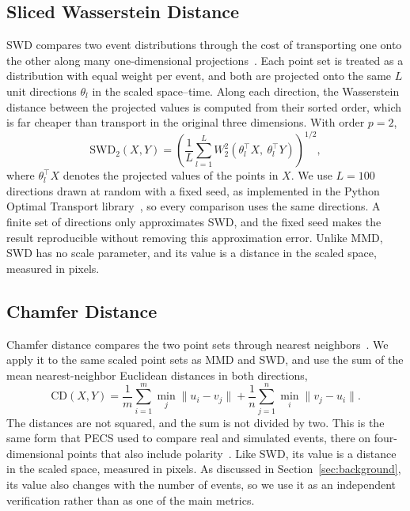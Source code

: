 \subsection{Sliced Wasserstein Distance}
\label{sec:swd}


SWD compares two event distributions through the cost of transporting one onto the other along many one-dimensional projections~\cite{bonneel2015sliced}. Each point set is treated as a distribution with equal weight per event, and both are projected onto the same $L$ unit directions $\theta_l$ in the scaled space--time. Along each direction, the Wasserstein distance between the projected values is computed from their sorted order, which is far cheaper than transport in the original three dimensions. With order $p = 2$,
\begin{equation}
  \mathrm{SWD}_2(X,Y) = \left( \frac{1}{L} \sum_{l=1}^{L} W_2^2\!\left(\theta_l^{\top}X,\ \theta_l^{\top}Y\right) \right)^{1/2},
  \label{eq:swd}
\end{equation}
where $\theta_l^{\top}X$ denotes the projected values of the points in $X$. We use $L = 100$ directions drawn at random with a fixed seed, as implemented in the Python Optimal Transport library~\cite{flamary2021pot}, so every comparison uses the same directions. A finite set of directions only approximates SWD, and the fixed seed makes the result reproducible without removing this approximation error. Unlike MMD, SWD has no scale parameter, and its value is a distance in the scaled space, measured in pixels.

\subsection{Chamfer Distance}
\label{sec:chamfer}


Chamfer distance compares the two point sets through nearest neighbors~\cite{fan2017pointset}. We apply it to the same scaled point sets as MMD and SWD, and use the sum of the mean nearest-neighbor Euclidean distances in both directions,
\begin{equation}
  \mathrm{CD}(X,Y) = \frac{1}{m}\sum_{i=1}^{m} \min_{j} \|u_i - v_j\| + \frac{1}{n}\sum_{j=1}^{n} \min_{i} \|v_j - u_i\|.
  \label{eq:chamfer}
\end{equation}
The distances are not squared, and the sum is not divided by two. This is the same form that PECS used to compare real and simulated events, there on four-dimensional points that also include polarity~\cite{han2024pecs}. Like SWD, its value is a distance in the scaled space, measured in pixels. As discussed in Section~\ref{sec:background}, its value also changes with the number of events, so we use it as an independent verification rather than as one of the main metrics.

